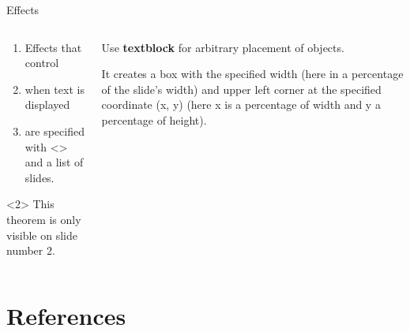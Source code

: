 \documentclass[english,MathSerif,aspectratio=169]{beamer}
\begin{document}
\begin{frame}{Effects}
    \begin{columns}[onlytextwidth]
        \begin{column}{0.49\textwidth}
            \begin{enumerate}[<+-|alert@+>]
                \item
                Effects that control

                \item
                when text is displayed

                \item
                are specified with <> and a list of slides.
            \end{enumerate}

            \begin{theorem}<2>
                This theorem is only visible on slide number 2.
            \end{theorem}
        \end{column}
        \begin{column}{0.49\textwidth}
            Use \textbf<2->{textblock} for arbitrary placement of objects.

            \pause
            \medskip

            It creates a box
            with the specified width (here in a percentage of the slide's width)
            and upper left corner at the specified coordinate (x, y)
            (here x is a percentage of width and y a percentage of height).
        \end{column}
    \end{columns}
\end{frame}


\section{References}
\end{document}
